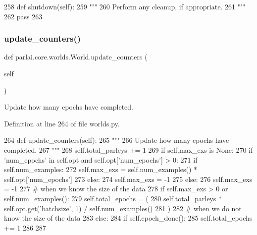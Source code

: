 \begin{DoxyCode}
258     \textcolor{keyword}{def }shutdown(self):
259         \textcolor{stringliteral}{"""}
260 \textcolor{stringliteral}{        Perform any cleanup, if appropriate.}
261 \textcolor{stringliteral}{        """}
262         \textcolor{keywordflow}{pass}
263 
\end{DoxyCode}
\mbox{\label{classparlai_1_1core_1_1worlds_1_1World_a77730e92a331274ab7b6ea3e7b99d1a4}} 
\subsubsection{\texorpdfstring{update\+\_\+counters()}{update\_counters()}}
{\footnotesize\ttfamily def parlai.\+core.\+worlds.\+World.\+update\+\_\+counters (\begin{DoxyParamCaption}\item[{}]{self }\end{DoxyParamCaption})}

\begin{DoxyVerb}Update how many epochs have completed.
\end{DoxyVerb}
 

Definition at line 264 of file worlds.\+py.


\begin{DoxyCode}
264     \textcolor{keyword}{def }update\_counters(self):
265         \textcolor{stringliteral}{"""}
266 \textcolor{stringliteral}{        Update how many epochs have completed.}
267 \textcolor{stringliteral}{        """}
268         self.total\_parleys += 1
269         \textcolor{keywordflow}{if} self.max\_exs \textcolor{keywordflow}{is} \textcolor{keywordtype}{None}:
270             \textcolor{keywordflow}{if} \textcolor{stringliteral}{'num\_epochs'} \textcolor{keywordflow}{in} self.opt \textcolor{keywordflow}{and} self.opt[\textcolor{stringliteral}{'num\_epochs'}] > 0:
271                 \textcolor{keywordflow}{if} self.num\_examples:
272                     self.max\_exs = self.num\_examples() * self.opt[\textcolor{stringliteral}{'num\_epochs'}]
273                 \textcolor{keywordflow}{else}:
274                     self.max\_exs = -1
275             \textcolor{keywordflow}{else}:
276                 self.max\_exs = -1
277         \textcolor{comment}{# when we know the size of the data}
278         \textcolor{keywordflow}{if} self.max\_exs > 0 \textcolor{keywordflow}{or} self.num\_examples():
279             self.total\_epochs = (
280                 self.total\_parleys * self.opt.get(\textcolor{stringliteral}{'batchsize'}, 1) / self.num\_examples()
281             )
282         \textcolor{comment}{# when we do not know the size of the data}
283         \textcolor{keywordflow}{else}:
284             \textcolor{keywordflow}{if} self.epoch\_done():
285                 self.total\_epochs += 1
286 
287 
\end{DoxyCode}


